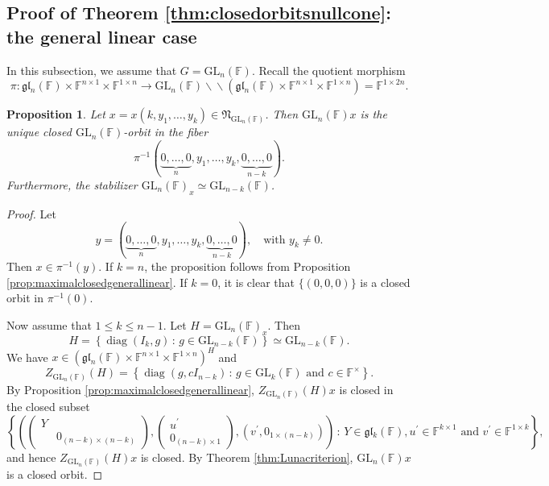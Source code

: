 \documentclass[12pt]{amsart}
\newtheorem{prop}[lm]{Proposition}
\theoremstyle{definition}
\theoremstyle{remark}\newtheorem{rmk}[lm]{Remark}
\newcommand{\GL}{{\mathrm{GL}}}
\newcommand{\diag}{\operatorname{diag}}
\newcommand{\gl}{\mathfrak g \mathfrak l}
\newcommand{\fN}{\mathfrak N}
\newcommand{\C}{\mathbb{F}}
\newcommand{\bac}{\backslash\!\!\backslash}
\renewcommand{\mid}{\,:\,}
\begin{document}
	\subsection{Proof of Theorem \ref{thm:closedorbitsnullcone}: the general linear case}
	In this subsection, we assume that $G=\GL_n(\C)$. Recall the quotient morphism $$\pi:\gl_n(\C)\times\C^{n\times 1}\times\C^{1\times n}\to\GL_n(\C)\bac(\gl_n(\C)\times\C^{n\times 1}\times\C^{1\times n})=\C^{1\times 2n}.$$
	\begin{prop}
		\label{prop:closedorbitgln}
		Let $x=x(k,y_1,\dots,y_k)\in\fN_{\GL_n(\C)}$. Then $\GL_n(\C)x$ is the unique closed $\GL_n(\C)$-orbit in the fiber$$\pi^{-1}(\underbrace{0,\dots,0}_n,y_1,\dots,y_k,\underbrace{0,\dots,0}_{n-k}).$$
Furthermore, the stabilizer $\GL_n(\C)_x\simeq\GL_{n-k}(\C)$.
	\end{prop}
	\begin{proof}
		Let
		\begin{equation*}
			y=(\underbrace{0,\dots,0}_n,y_1,\dots,y_k,\underbrace{0,\dots,0}_{n-k}),\quad\text{with }y_k\neq 0.
		\end{equation*}
		Then $x\in\pi^{-1}(y)$. If $k=n$, the proposition follows from Proposition \ref{prop:maximalclosedgenerallinear}. If $k=0$, it is clear that $\{(0,0,0)\}$ is a closed orbit in $\pi^{-1}(0)$.
        
        Now assume that $1\leq k\leq n-1$. Let $H=\GL_n(\C)_x$. Then
		\begin{equation*}
			H=\left\{\diag(I_k,g)\mid g\in \GL_{n-k}(\C)\right\}\simeq\GL_{n-k}(\C).
		\end{equation*}
		We have $x\in(\gl_n(\C)\times\C^{n\times 1}\times\C^{1\times n})^H$ and
		\begin{equation*}
			Z_{\GL_n(\C)}(H)=\left\{\diag(g,cI_{n-k})\mid g\in\GL_k(\C)\text{ and }c\in\C^{\times}\right\}.
		\end{equation*}
		By Proposition \ref{prop:maximalclosedgenerallinear}, $Z_{\GL_n(\C)}(H)x$ is closed in the closed subset
		\begin{equation*}
			\left\{\left(\left(\begin{matrix}
				Y&\\&0_{(n-k)\times(n-k)}
			\end{matrix}\right),\left(\begin{matrix}
				u^{\prime}\\0_{(n-k)\times 1}
			\end{matrix}\right),(v^{\prime},0_{1\times(n-k)})\right)\mid Y\in\gl_k(\C),u^{\prime}\in\C^{k\times 1}\text{ and }v^{\prime}\in\C^{1\times k}\right\},
		\end{equation*}
		and hence $Z_{\GL_n(\C)}(H)x$ is closed. By Theorem \ref{thm:Lunacriterion}, $\GL_n(\C)x$ is a closed orbit.
	\end{proof}
	
\end{document}

